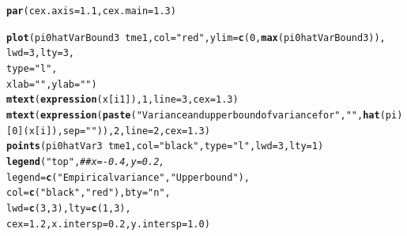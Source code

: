 \documentclass{article}\usepackage[]{graphicx}\usepackage[]{color}
\makeatletter
\newcommand{\hlnum}[1]{\textcolor[rgb]{0.686,0.059,0.569}{#1}}%
\newcommand{\hlstr}[1]{\textcolor[rgb]{0.192,0.494,0.8}{#1}}%
\newcommand{\hlcom}[1]{\textcolor[rgb]{0.678,0.584,0.686}{\textit{#1}}}%
\newcommand{\hlopt}[1]{\textcolor[rgb]{0,0,0}{#1}}%
\newcommand{\hlstd}[1]{\textcolor[rgb]{0.345,0.345,0.345}{#1}}%
\newcommand{\hlkwc}[1]{\textcolor[rgb]{0.333,0.667,0.333}{#1}}%
\newcommand{\hlkwd}[1]{\textcolor[rgb]{0.737,0.353,0.396}{\textbf{#1}}}%
\newenvironment{kframe}{%
 \def\at@end@of@kframe{}%
 \ifinner\ifhmode%
  \def\at@end@of@kframe{\end{minipage}}%
  \begin{minipage}{\columnwidth}%
 \fi\fi%
 \def\FrameCommand##1{\hskip\@totalleftmargin \hskip-\fboxsep
 \colorbox{shadecolor}{##1}\hskip-\fboxsep
     \hskip-\linewidth \hskip-\@totalleftmargin \hskip\columnwidth}%
 \MakeFramed {\advance\hsize-\width
   \@totalleftmargin\z@ \linewidth\hsize
   \@setminipage}}%
 {\par\unskip\endMakeFramed%
 \at@end@of@kframe}
\newenvironment{knitrout}{}{} %
\makeatother
\begin{document}
\begin{knitrout}
\color{fgcolor}\begin{kframe}
\begin{alltt}
\hlkwd{par}\hlstd{(}\hlkwc{cex.axis} \hlstd{=} \hlnum{1.1}\hlstd{,} \hlkwc{cex.main}\hlstd{=}\hlnum{1.3}\hlstd{)}

\hlkwd{plot}\hlstd{(pi0hatVarBound3} \hlopt{~} \hlstd{tme1,} \hlkwc{col}\hlstd{=}\hlstr{"red"}\hlstd{,} \hlkwc{ylim}\hlstd{=}\hlkwd{c}\hlstd{(}\hlnum{0}\hlstd{,} \hlkwd{max}\hlstd{(pi0hatVarBound3)),}
     \hlkwc{lwd}\hlstd{=}\hlnum{3}\hlstd{,} \hlkwc{lty}\hlstd{=}\hlnum{3}\hlstd{,}
     \hlkwc{type}\hlstd{=}\hlstr{"l"}\hlstd{,}
     \hlkwc{xlab}\hlstd{=}\hlstr{""}\hlstd{,} \hlkwc{ylab}\hlstd{=}\hlstr{""}\hlstd{)}
\hlkwd{mtext}\hlstd{(}\hlkwd{expression}\hlstd{(x[i1]),} \hlnum{1}\hlstd{,} \hlkwc{line}\hlstd{=}\hlnum{3}\hlstd{,} \hlkwc{cex}\hlstd{=}\hlnum{1.3}\hlstd{)}
\hlkwd{mtext}\hlstd{(}\hlkwd{expression}\hlstd{(}\hlkwd{paste}\hlstd{(}\hlstr{"Variance and upper bound of variance for "}\hlstd{,} \hlstr{" "}\hlstd{,} \hlkwd{hat}\hlstd{(pi)[}\hlnum{0}\hlstd{](x[i]),} \hlkwc{sep}\hlstd{=}\hlstr{" "}\hlstd{)),} \hlnum{2}\hlstd{,} \hlkwc{line}\hlstd{=}\hlnum{2}\hlstd{,} \hlkwc{cex}\hlstd{=}\hlnum{1.3}\hlstd{)}
\hlkwd{points}\hlstd{(pi0hatVar3} \hlopt{~} \hlstd{tme1,} \hlkwc{col}\hlstd{=}\hlstr{"black"}\hlstd{,} \hlkwc{type}\hlstd{=}\hlstr{"l"}\hlstd{,} \hlkwc{lwd}\hlstd{=}\hlnum{3}\hlstd{,} \hlkwc{lty}\hlstd{=}\hlnum{1}\hlstd{)}
\hlkwd{legend}\hlstd{(}\hlstr{"top"}\hlstd{,} \hlcom{##x=-0.4, y=0.2, }
       \hlkwc{legend}\hlstd{=}\hlkwd{c}\hlstd{(}\hlstr{"Empirical variance"}\hlstd{,} \hlstr{"Upper bound"}\hlstd{),}
       \hlkwc{col}\hlstd{=}\hlkwd{c}\hlstd{(}\hlstr{"black"}\hlstd{,} \hlstr{"red"}\hlstd{),} \hlkwc{bty}\hlstd{=}\hlstr{"n"}\hlstd{,}
       \hlkwc{lwd}\hlstd{=}\hlkwd{c}\hlstd{(}\hlnum{3}\hlstd{,}\hlnum{3}\hlstd{),} \hlkwc{lty}\hlstd{=}\hlkwd{c}\hlstd{(}\hlnum{1}\hlstd{,}\hlnum{3}\hlstd{),}
       \hlkwc{cex}\hlstd{=}\hlnum{1.2}\hlstd{,} \hlkwc{x.intersp}\hlstd{=}\hlnum{0.2}\hlstd{,} \hlkwc{y.intersp}\hlstd{=}\hlnum{1.0}\hlstd{)}
\end{alltt}
\end{kframe}


\end{knitrout}
\end{document}
